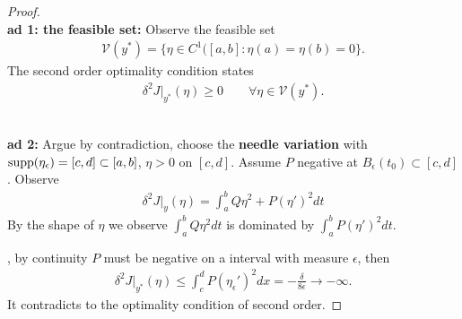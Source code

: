 \begin{proof}
\quad\\
\textbf{ad 1: the feasible set:}
Observe the feasible set 
\begin{align*}
	\mathcal{V}(y^*) = \{ \eta \in C^1([a, b]: \eta(a) = \eta(b) = 0\}.
\end{align*}
The second order optimality condition states
\begin{align*}
	\delta^2 J|_{y^*} (\eta) \ge 0 \qquad \forall \eta \in \mathcal{V}(y^*). 
\end{align*}
	
\quad\\
\textbf{ad 2:}
Argue by contradiction, choose the \textbf{needle variation} with $\operatorname*{supp}(\eta_\epsilon) = [c, d] \subset [a, b]$, $\eta > 0$ on $[c, d]$. Assume $P$ negative at $B_\epsilon(t_0) \subset [c, d]$. Observe 
\begin{align*}
	\delta^2 J|_y(\eta) = \int_a^b Q \eta^2 + P (\eta')^2 dt
\end{align*}
By the shape of $\eta$ we observe $\int_a^b Q \eta^2 dt$ is dominated by $\int_a^b P (\eta')^2 dt$. \par 
	, by continuity $P$ must be negative on a interval with measure $\epsilon$, then 
\begin{align*}
	\delta^2 J|_{y^*}(\eta) \le  \int_c^d P (\eta_\epsilon ')^2 dx 
		= - \frac{\delta}{8 \epsilon}  \longrightarrow -\infty.
\end{align*}
	It contradicts to the optimality condition of second order. 
\end{proof}


